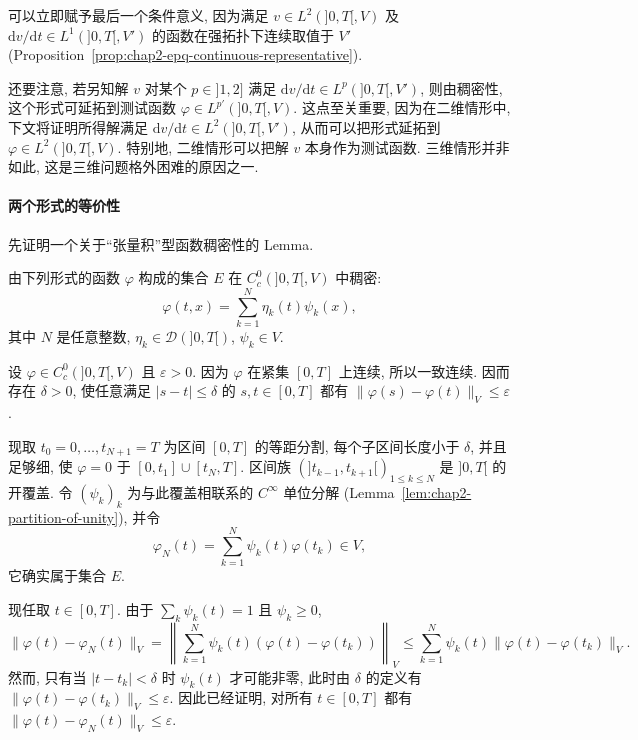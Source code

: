 可以立即赋予最后一个条件意义, 因为满足 $v\in L^2(]0,T[,V)$ 及 $\mathrm dv/\mathrm dt\in L^1(]0,T[,V')$ 的函数在强拓扑下连续取值于 $V'$ (Proposition~\ref{prop:chap2-epq-continuous-representative}).

还要注意, 若另知解 $v$ 对某个 $p\in]1,2]$ 满足 $\mathrm dv/\mathrm dt\in L^p(]0,T[,V')$, 则由稠密性, 这个形式可延拓到测试函数 $\varphi\in L^{p'}(]0,T[,V)$. 这点至关重要, 因为在二维情形中, 下文将证明所得解满足 $\mathrm dv/\mathrm dt\in L^2(]0,T[,V')$, 从而可以把形式延拓到 $\varphi\in L^2(]0,T[,V)$. 特别地, 二维情形可以把解 $v$ 本身作为测试函数. 三维情形并非如此, 这是三维问题格外困难的原因之一.

\paragraph{两个形式的等价性}

先证明一个关于``张量积''型函数稠密性的 Lemma.

\begin{Lemma}
\label{lem:chap5-tensor-test-density}
由下列形式的函数 $\varphi$ 构成的集合 $E$ 在 $C_c^0(]0,T[,V)$ 中稠密:
\[
 \varphi(t,x)=\sum_{k=1}^N\eta_k(t)\psi_k(x),
\]
其中 $N$ 是任意整数, $\eta_k\in\mathcal D(]0,T[)$, $\psi_k\in V$.
\end{Lemma}

\begin{Proof}
设 $\varphi\in C_c^0(]0,T[,V)$ 且 $\varepsilon>0$. 因为 $\varphi$ 在紧集 $[0,T]$ 上连续, 所以一致连续. 因而存在 $\delta>0$, 使任意满足 $|s-t|\leq\delta$ 的 $s,t\in[0,T]$ 都有 $\|\varphi(s)-\varphi(t)\|_V\leq\varepsilon$.

现取 $t_0=0,\ldots,t_{N+1}=T$ 为区间 $[0,T]$ 的等距分割, 每个子区间长度小于 $\delta$, 并且足够细, 使 $\varphi=0$ 于 $[0,t_1]\cup[t_N,T]$. 区间族 $(]t_{k-1},t_{k+1}[)_{1\leq k\leq N}$ 是 $]0,T[$ 的开覆盖. 令 $(\psi_k)_k$ 为与此覆盖相联系的 $C^\infty$ 单位分解 (Lemma~\ref{lem:chap2-partition-of-unity}), 并令
\[
 \varphi_N(t)=\sum_{k=1}^N\psi_k(t)\varphi(t_k)\in V,
\]
它确实属于集合 $E$.

现任取 $t\in[0,T]$. 由于 $\sum_k\psi_k(t)=1$ 且 $\psi_k\geq0$,
\[
 \|\varphi(t)-\varphi_N(t)\|_V
 =\left\|\sum_{k=1}^N\psi_k(t)(\varphi(t)-\varphi(t_k))\right\|_V
 \leq\sum_{k=1}^N\psi_k(t)\|\varphi(t)-\varphi(t_k)\|_V.
\]
然而, 只有当 $|t-t_k|<\delta$ 时 $\psi_k(t)$ 才可能非零, 此时由 $\delta$ 的定义有 $\|\varphi(t)-\varphi(t_k)\|_V\leq\varepsilon$. 因此已经证明, 对所有 $t\in[0,T]$ 都有 $\|\varphi(t)-\varphi_N(t)\|_V\leq\varepsilon$.
\end{Proof}

